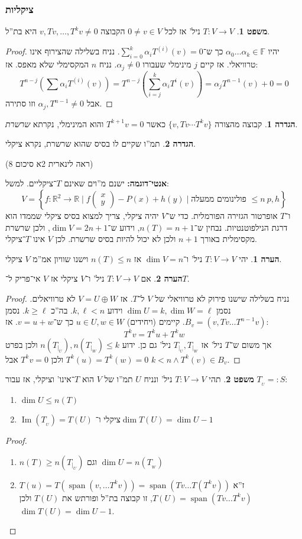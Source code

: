 \documentclass[a4paper]{article}
\newcommand\R     {\mathbb{R}}
\newcommand\ml    {\ell}
\DeclareMathOperator\Img   {Im}
\DeclareMathOperator{\Sp}      {span}
\newcommand\F         {\mathbb{F}}
\newcommand\co        {\colon}
\newcommand\pms[1]    {\begin{pmatrix}
		#1
\end{pmatrix}}
\newcommand\ag        {\alpha}
\newcommand\cl [1]    {\left ( #1 \right )}
\newcommand\ccb[1]    {\left \{ #1 \right \}}
\theoremstyle{definition}
\newtheorem{Theorem}{משפט}
\newtheorem{definition}{הגדרה}
\newtheorem{Remark}{הערה}
\newcommand\theo  [1] {\begin{Theorem}#1\end{Theorem}}
\newcommand\defi  [1] {\begin{definition}#1\end{definition}}
\newcommand\rmark [1] {\begin{Remark}#1\end{Remark}}
\begin{document}
	\subsubsection{ציקליות}
	\theo{$T \co V \to V$ ניל' אז לכל $0 \neq v \in V$ הקבוצה $v, Tv, \dots, T^{k}v \neq 0$ היא בת''ל. }
	\begin{proof}
		יהיו $\ag_0 \dots \ag_k \in \F$ כך ש־$\sum_{i = 0}^{k}\ag_i T^{(i)}(v) = 0$. נניח בשלילה שהצירוף אינו טרוויאלי. אז קיים $j$ מינימלי שעבורו $\ag_j \neq 0$. נניח $n$ המקסימלי שלא מאפס. אז: 
		\[ T^{n - j}\cl{\sum \ag_i T^{(i)}(v)} = T^{n - j}\cl{\sum_{i = j}^{k}\ag_iT^{i}(v)} = \ag_jT^{n - 1}(v) + 0 = 0 \]
		אבל $\ag_j, T^{n - 1} \neq 0$ וזו סתירה. 
	\end{proof}
	
	\defi{קבוצה מהצורה $\{v, Tv \cdots T^kv\}$ כאשר $T^{k + 1}v = 0$ והוא המינימלי, נקרתא \textit{שרשרת}. }
	
	\defi{תמ''ו שקיים לו בסיס שהוא שרשרת, נקרא ציקלי. }(ראה לינארית 2א סיכום 8) %
	
	\textbf{אנטי־דוגמה: }ישנם מ''וים שאינם $T$־ציקליים. למשל: 
	\[ V = \ccb{f \co \R^2 \to \R \mid f\pms{x \\ y} - P(x) + h(y) \mid \text{פולינומים ממעלה $\le n$} \ p, h} \]
	ו־$T$ אופרטור הגזירה הפורמלית. 
	כדי ש־$V$ יהיה ציקלי, צריך למצוא בסיס ציקלי שממדו הוא דרגת הנילפוטנטיות. נבחין ש־$n(T) = n  + 1$, וידוע ש־$\dim V = 2n + 1$, ולכן שרשרת מקסימלית באורך $n + 1$ ולכן לא יכול להיות בסיס שרשרת. לכן $V$ אינו $T$־ציקלי. 
	
	\rmark{יהי $T \co V \to V$ ניל' ו־$\dim V = n$ אז $n(T) \le n$ וישנו שוויון אמ''מ $V$ ציקלי. }
	
	\rmark{אם $T \co V \to V$ ניל' ו־$V$ ציקלי אז $V$ אי־פריק ל־$T$. }
	\begin{proof}
		נניח בשלילה שישנו פירוק לא טרוויאלי של $V$ ל־$T$. אז $V = U \oplus W$ לא טרוויאלים. נסמן $\dim U = k, \dim W = \ml$ וידוע $k, \ml < n$. בה''כ $k \ge \ml$. נסמן $B_v = (v, Tv \dots T^{n - 1}v)$. קיימים (ויחידים) $u \in U, w \in W$ כך ש־$v = u + w$. אז: 
		\[ T^{k}v = T^ku + T^kw \]
		אך משום ש־$T$ ניל' אז $T_{|_U}, T_{|_W}$ ניל' גם כן. ידוע $n(T_{|_U}), n(T_{|_W}) \le k$ ולכן בפרט $T^{k}(u) = T^{k}(w) = 0$ ולכן $T^{k}v = 0$ אבל $k < n \land T^k(v) \in B_v$. 
	\end{proof}
	
	\theo{תהי $T \co V \to V$ ניל' ונניח $U$ תמ''ו של $V$ הוא $T$־אינו' וציקלי, אז עבור $T_{_U} =: S$: 
		\begin{enumerate}
			\item $\dim U \le n(T)$
			\item $\Img(T_{_U}) = T(U)$ ציקלי ו־$\dim T(U) = \dim U - 1$
	\end{enumerate}}
	\begin{proof}\,
		\begin{enumerate}
			\item $n(T) \ge n(T_{|_U})$ וגם $\dim U = n(T_{_W})$
			\item $T(u) = T(\Sp(v, \dots T^{k}v)) = \Sp (Tv \dots T(T^k v))$ ז''א $T(U) = \Sp(Tv \dots T^k v)$, זו קבוצה בת''ל ופורתש את $T(U)$ ולכן $\dim T(U) = \dim U - 1$. 
		\end{enumerate}
	\end{proof}
	
\end{document}
